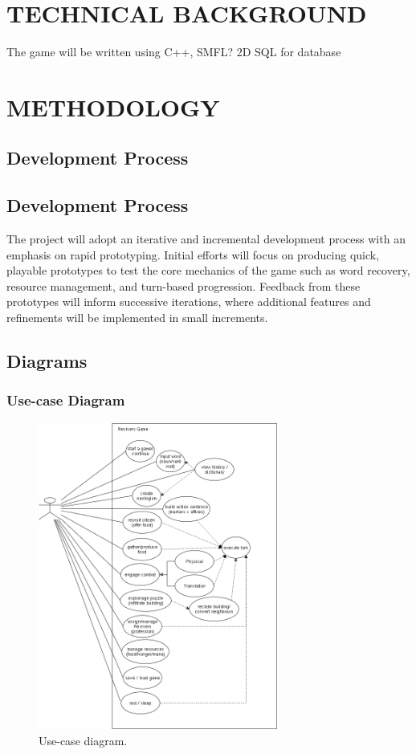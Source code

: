 \documentclass[11pt]{article}
\begin{document}
\section{TECHNICAL BACKGROUND}
The game will be written using C++, SMFL? 2D
SQL for database

\section{METHODOLOGY}
\subsection{Development Process}
\subsection{Development Process}
The project will adopt an iterative and incremental development process with an emphasis on rapid prototyping. 
Initial efforts will focus on producing quick, playable prototypes to test the core mechanics of the game such as word recovery, resource management, and turn-based progression. 
Feedback from these prototypes will inform successive iterations, where additional features and refinements will be implemented in small increments.\\

\subsection{Diagrams}
\subsubsection{Use-case Diagram}

\begin{figure}[H]
  \centering
  \includegraphics[width=0.7\textwidth]{diagrams/usecase.png}
  \caption{Use-case diagram.}
  \label{fig:usecase}
\end{figure}
\end{document}
